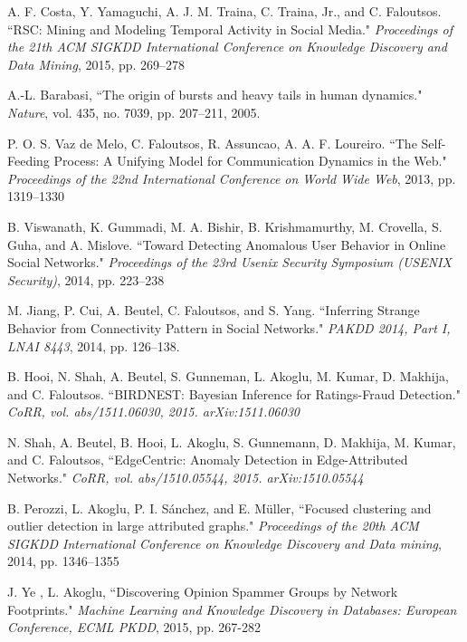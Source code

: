 \documentclass[11pt, oneside]{article}   	%
\begin{document}
\begin{thebibliography}{123}

 A. F. Costa, Y. Yamaguchi, A. J. M. Traina, C. Traina, Jr., and C. Faloutsos. ``RSC: Mining and Modeling Temporal Activity in Social Media." \emph{Proceedings of the 21th ACM SIGKDD International Conference on Knowledge Discovery and Data Mining}, 2015, pp. 269--278

 A.-L. Barabasi, ``The origin of bursts and heavy tails in human dynamics." \emph{Nature}, vol. 435, no. 7039, pp. 207--211, 2005. 

 P. O. S. Vaz de Melo, C. Faloutsos, R. Assuncao, A. A. F. Loureiro. ``The Self-Feeding Process: A Unifying Model for Communication Dynamics in the Web." \emph{Proceedings of the 22nd International Conference on World Wide Web}, 2013, pp. 1319--1330 

 B. Viswanath, K. Gummadi, M. A. Bishir, B. Krishmamurthy, M. Crovella, S. Guha, and A. Mislove. ``Toward Detecting Anomalous User Behavior in Online Social Networks." \emph{Proceedings of the 23rd Usenix Security Symposium (USENIX Security)}, 2014, pp. 223--238

 M. Jiang, P. Cui, A. Beutel, C. Faloutsos, and S. Yang. ``Inferring Strange Behavior from Connectivity Pattern in Social Networks." \emph{PAKDD 2014, Part I, LNAI 8443}, 2014, pp. 126--138.

 B. Hooi, N. Shah, A. Beutel, S. Gunneman, L. Akoglu, M. Kumar, D. Makhija, and C. Faloutsos. ``BIRDNEST: Bayesian Inference for Ratings-Fraud Detection." \emph{CoRR, vol. abs/1511.06030, 2015. arXiv:1511.06030}

 N. Shah, A. Beutel, B. Hooi, L. Akoglu, S. Gunnemann, D. Makhija, M. Kumar, and C. Faloutsos, ``EdgeCentric: Anomaly Detection in Edge-Attributed Networks." \emph{CoRR, vol. abs/1510.05544, 2015. arXiv:1510.05544}

 B. Perozzi, L. Akoglu, P. I. Sánchez, and E. Müller, ``Focused clustering and outlier detection in large attributed graphs." \emph{Proceedings of the 20th ACM SIGKDD International Conference on Knowledge Discovery and Data mining}, 2014, pp. 1346--1355

 J. Ye , L. Akoglu, ``Discovering Opinion Spammer Groups by Network Footprints." \emph{Machine Learning and Knowledge Discovery in Databases: European Conference, ECML PKDD}, 2015, pp. 267-282


\end{thebibliography}
\end{document}

